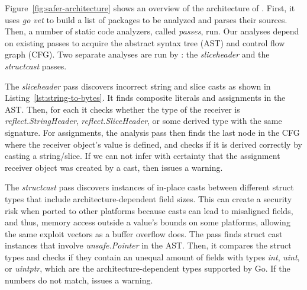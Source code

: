 


Figure~\ref{fig:safer-architecture} shows an overview of the architecture of \toolSA{}.
First, it uses \textit{go vet} to build a list of packages to be analyzed and parses their sources.
Then, a number of static code analyzers, called \textit{passes}, run.
Our analyses depend on existing passes to acquire the abstract syntax tree (AST) and control flow graph (CFG).
Two separate analyses are run by \toolSA{}: the \textit{sliceheader} and the \textit{structcast} passes. %


The \textit{sliceheader} pass discovers incorrect string and slice casts as shown in Listing~\ref{lst:string-to-bytes}.
It finds composite literals and assignments in the AST.
Then, for each it checks whether the type of the %
receiver is \textit{reflect.StringHeader}, \textit{reflect.SliceHeader}, or some derived type with the same signature.
For assignments, the analysis pass then finds the last node in the CFG where the receiver object's value is defined, and checks if it is derived correctly by casting a string/slice.
If we can not infer with certainty that the assignment receiver object was created by a cast, then \toolSA{} issues a warning.

The \textit{structcast} pass discovers instances of in-place casts between different struct types that include architecture-dependent field sizes. 
This can create a security risk when ported to other platforms because \unsafe{} casts can lead to misaligned fields, and thus, memory access outside a value's bounds on some platforms, allowing the same exploit vectors as a buffer overflow does.
The pass finds struct cast instances that involve \textit{unsafe.Pointer} in the AST.
Then, it compares the struct types and checks if they contain an unequal amount of fields with types \textit{int}, \textit{uint}, or \textit{uintptr}, which are the architecture-dependent types supported by Go.
If the numbers do not match, \toolSA{} issues a warning.

